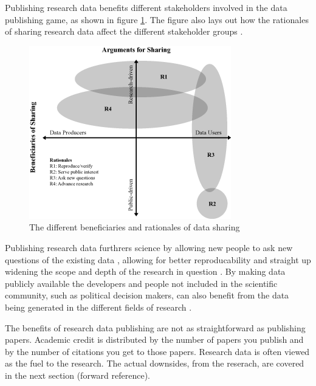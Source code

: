 Publishing research data benefits different stakeholders involved in the
data publishing game, as shown in figure \ref{fig:beneficaries}. The figure
also lays out how the rationales of sharing research data affect the different
stakeholder groups \cite{DBLP:journals/jasis/Borgman12}.

\begin{figure}
    \begin{centering}
        \includegraphics[width=\textwidth]{images/beneficaries}
    \end{centering}
    \caption{The different beneficiaries and rationales of data sharing \cite{DBLP:journals/jasis/Borgman12}}
    \label{fig:beneficaries}
\end{figure}

Publishing research data furthrers science by allowing new people to ask new
questions of the existing data \cite{whitlock2011data}, allowing for better
reproducability \cite{jasny2011again} and straight up widening the scope and
depth of the research in question \cite{DBLP:journals/see/FischerZ10}.
By making data publicly available the developers and people not included in the
scientific community, such as political decision makers, can also benefit from
the data being generated in the different fields of research
\cite{DBLP:journals/jasis/Borgman12}.

The benefits of research data publishing are not as straightforward as
publishing papers. Academic credit is distributed by the number of papers you
publish and by the number of citations you get to those papers. Research data
is often viewed as the fuel to the research. The actual downsides, from the
reserach, are covered in the next section (forward reference).

